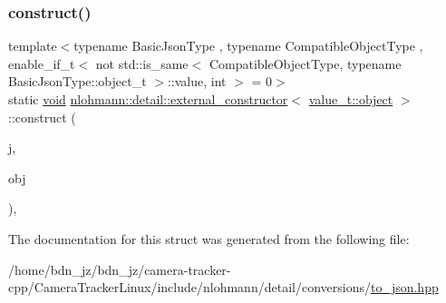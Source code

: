 \mbox{\label{structnlohmann_1_1detail_1_1external__constructor_3_01value__t_1_1object_01_4_a91f89abe0ec4dec59099b691682ff927}} 
\subsubsection{\texorpdfstring{construct()}{construct()}\hspace{0.1cm}{\footnotesize\ttfamily [3/3]}}
{\footnotesize\ttfamily template$<$typename Basic\+Json\+Type , typename Compatible\+Object\+Type , enable\+\_\+if\+\_\+t$<$ not std\+::is\+\_\+same$<$ Compatible\+Object\+Type, typename Basic\+Json\+Type\+::object\+\_\+t $>$\+::value, int $>$  = 0$>$ \\
static \hyperlink{namespacenlohmann_1_1detail_a59fca69799f6b9e366710cb9043aa77d}{void} \hyperlink{structnlohmann_1_1detail_1_1external__constructor}{nlohmann\+::detail\+::external\+\_\+constructor}$<$ \hyperlink{namespacenlohmann_1_1detail_a1ed8fc6239da25abcaf681d30ace4985aa8cfde6331bd59eb2ac96f8911c4b666}{value\+\_\+t\+::object} $>$\+::construct (\begin{DoxyParamCaption}\item[{Basic\+Json\+Type \&}]{j,  }\item[{const Compatible\+Object\+Type \&}]{obj }\end{DoxyParamCaption})\hspace{0.3cm}{\ttfamily [inline]}, {\ttfamily [static]}}



The documentation for this struct was generated from the following file\+:\begin{DoxyCompactItemize}
\item 
/home/bdn\+\_\+jz/bdn\+\_\+jz/camera-\/tracker-\/cpp/\+Camera\+Tracker\+Linux/include/nlohmann/detail/conversions/\hyperlink{to__json_8hpp}{to\+\_\+json.\+hpp}\end{DoxyCompactItemize}

